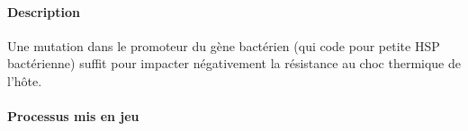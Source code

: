 \paragraph{Description} %
\label{par:buchnera_description}


Une mutation dans le promoteur du gène bactérien  (qui code pour
petite HSP bactérienne) suffit pour impacter négativement la résistance au
choc thermique de l'hôte. \cite{dunbar2007}

\paragraph{Processus mis en jeu} %
\label{par:buchnera_process}
